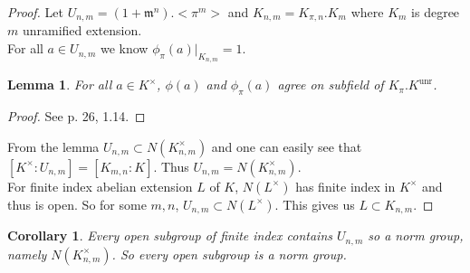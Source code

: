 \documentclass[twoside, 12pt]{iiser-thesis}
\newtheorem{lem}[thm]{ Lemma}
\newtheorem{cor}[thm]{ Corollary}
\newcommand{\x}{\times}
\newcommand{\un}{\text{unr}}
\begin{document}
\begin{proof}
Let $U_{n,m}=(1 + \mathfrak m ^n). <\pi ^m>$ and $K_{n,m}=K_{\pi,n}.K_m$ where $K_m $ is degree $m$ unramified extension. \\
For all $a\in U_{n,m}$ we know $ \phi _\pi (a) \big | _{K_{n,m}}=1$. 
\begin{lem}
For all $a\in K^\x$, $\phi (a) $ and $\phi _\pi (a)$ agree on subfield of $K_{\pi}.K^\un $.
\end{lem}
\begin{proof}
See \cite{milneCFT} p. 26, 1.14.
\end{proof}
From the lemma $U_{n,m} \subset N(K^\x _{n,m})$ and one can easily see that $[K^\x :U_{n,m}]=[K_{m,n}:K]$. Thus $U_{n,m}= N(K^\x _{n,m})$. \\
For finite index abelian extension $L$ of $K$, $N(L^\x)$ has finite index in $K^\x$ and thus is open. So for some $m,n$, $U _{n,m} \subset N(L^\x)$. This gives us $L \subset K_{n,m}$.
\end{proof}
\begin{cor}
Every open subgroup of finite index contains $U_{n,m}$ so a norm group, namely $N(K^\x _{n,m})$. So every open subgroup is a norm group.  
\end{cor}














\end{document}
